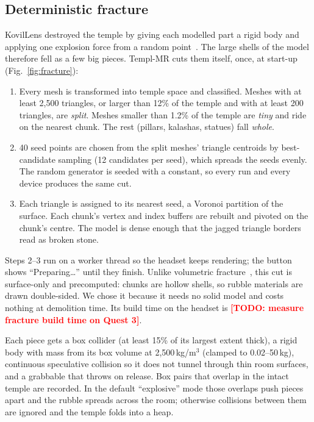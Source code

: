 \documentclass[conference]{IEEEtran}
\newcommand{\TODO}[1]{\textcolor{red}{\textbf{[TODO: #1]}}}
\begin{document}
\subsection{Deterministic fracture}
KovilLens destroyed the temple by giving each modelled part a rigid body and applying one explosion force from a random point~\cite{kovillens2025}. The large shells of the model therefore fell as a few big pieces. Templ-MR cuts them itself, once, at start-up (Fig.~\ref{fig:fracture}):
\begin{enumerate}
\item Every mesh is transformed into temple space and classified. Meshes with at least 2,500 triangles, or larger than 12\% of the temple and with at least 200 triangles, are \emph{split}. Meshes smaller than 1.2\% of the temple are \emph{tiny} and ride on the nearest chunk. The rest (pillars, kalashas, statues) fall \emph{whole}.
\item 40 seed points are chosen from the split meshes' triangle centroids by best-candidate sampling (12 candidates per seed), which spreads the seeds evenly. The random generator is seeded with a constant, so every run and every device produces the same cut.
\item Each triangle is assigned to its nearest seed, a Voronoi partition of the surface. Each chunk's vertex and index buffers are rebuilt and pivoted on the chunk's centre. The model is dense enough that the jagged triangle borders read as broken stone.
\end{enumerate}
Steps 2--3 run on a worker thread so the headset keeps rendering; the button shows ``Preparing\ldots'' until they finish. Unlike volumetric fracture~\cite{muller2013}, this cut is surface-only and precomputed: chunks are hollow shells, so rubble materials are drawn double-sided. We chose it because it needs no solid model and costs nothing at demolition time. Its build time on the headset is \TODO{measure fracture build time on Quest 3}.

Each piece gets a box collider (at least 15\% of its largest extent thick), a rigid body with mass from its box volume at 2,500\,kg/m$^3$ (clamped to 0.02--50\,kg), continuous speculative collision so it does not tunnel through thin room surfaces, and a grabbable that throws on release. Box pairs that overlap in the intact temple are recorded. In the default ``explosive'' mode those overlaps push pieces apart and the rubble spreads across the room; otherwise collisions between them are ignored and the temple folds into a heap.
\end{document}

